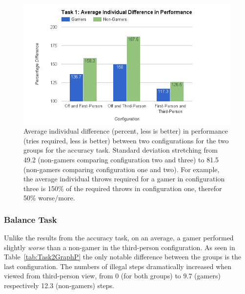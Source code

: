 \documentclass[runningheads,a4paper,oribibl]{llncs}
\begin{document}

\begin{figure}
   \centering
   \includegraphics[width=\textwidth]{ExternalMaterial/Task1GraphD}
   \caption{Average individual difference (percent, less is better) in performance (tries required, less is better) between two configurations for the two groups for the accuracy task. Standard deviation stretching from 49.2 (non-gamers comparing configuration two and three) to 81.5 (non-gamers comparing configuration one and two). For example, the average individual throws required for a gamer in configuration three is 150\% of the required throws in configuration one, therefor 50\% worse/more.} \label{fig:Task1GraphD}
\end{figure}












\subsubsection{Balance Task}
Unlike the results from the accuracy task, on an average, a gamer performed slightly \emph{worse} than a non-gamer in the third-person configuration. As seen in Table~\ref{tab:Task2GraphP} the only notable difference between the groups is the last configuration. The numbers of illegal steps dramatically increased when viewed from third-person view, from 0 (for both groups) to 9.7 (gamers) respectively 12.3 (non-gamers) steps.  
\end{document}
